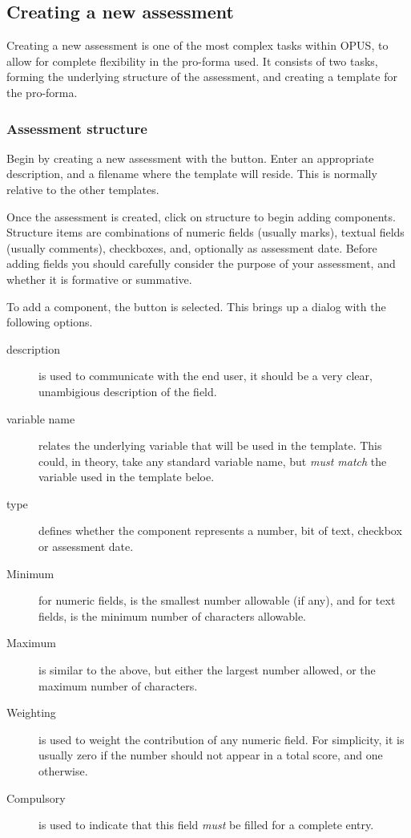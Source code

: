 \documentclass[12 pt]{book}
\begin{document}
\subsection{Creating a new assessment}

Creating a new assessment is one of the most complex tasks within OPUS,
to allow for complete flexibility in the pro-forma used. It consists of
two tasks, forming the underlying structure of the assessment, and
creating a template for the pro-forma.

\subsubsection{Assessment structure}

Begin by creating a new assessment with the  button.
Enter an appropriate description, and a filename where the template
will reside. This is normally relative to the other templates.

Once the assessment is created, click on structure to begin adding
components. Structure items are combinations of numeric fields (usually
marks), textual fields (usually comments), checkboxes, and, optionally
as assessment date. Before adding fields you should carefully consider
the purpose of your assessment, and whether it is formative or summative.

To add a component, the  button is selected. This brings
up a dialog with the following options.

\begin{description}
  \item[description] is used to communicate with the end user, it should
  be a very clear, unambigious description of the field.
  \item[variable name] relates the underlying variable that will be used
  in the template. This could, in theory, take any standard variable
  name, but \emph{must match} the variable used in the template beloe.
  \item[type] defines whether the component represents a number, bit of
  text, checkbox or assessment date.
  \item[Minimum] for numeric fields, is the smallest number allowable 
  (if any), and for text fields, is the minimum number of characters
  allowable.
  \item[Maximum] is similar to the above, but either the largest number
  allowed, or the maximum number of characters.
  \item[Weighting] is used to weight the contribution of any numeric
  field. For simplicity, it is usually zero if the number should not
  appear in a total score, and one otherwise.
  \item[Compulsory] is used to indicate that this field \emph{must} be
  filled for a complete entry.
\end{description}
\end{document}
